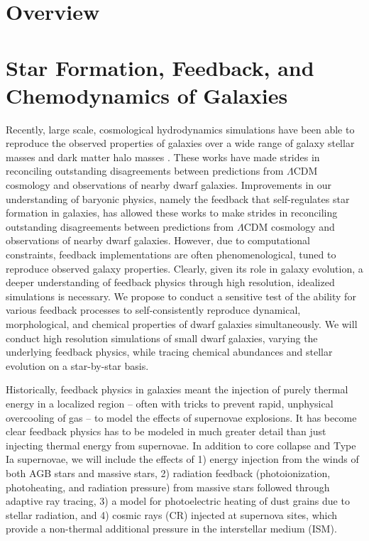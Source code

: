 \documentclass[11pt]{article}
\newcommand{\eg}{e.g.,}
\begin{document}
\maketitle

\section{Overview}

\section{Star Formation, Feedback, and Chemodynamics of Galaxies}

Recently, large scale, cosmological hydrodynamics simulations have been able to reproduce the observed properties of galaxies over a wide range of galaxy stellar masses and dark matter halo masses \citep[\eg][]{MUGS2010, MAGICC2013, Illustris1, Illustris2, OWLS, EAGLE, FIRE, APOSTLE, Latte}. These works have made strides in reconciling outstanding disagreements between predictions from $\Lambda$CDM cosmology and observations of nearby dwarf galaxies. Improvements in our understanding of baryonic physics, namely the feedback that self-regulates star formation in galaxies, has allowed these works to make strides in reconciling outstanding disagreements between predictions from $\Lambda$CDM cosmology and observations of nearby dwarf galaxies. However, due to computational constraints, feedback implementations are often phenomenological, tuned to reproduce observed galaxy properties. Clearly, given its role in galaxy evolution, a deeper understanding of feedback physics through high resolution, idealized simulations is necessary. We propose to conduct a sensitive test of the ability for various feedback processes to self-consistently reproduce dynamical, morphological, and chemical properties of dwarf galaxies simultaneously. We will conduct high resolution simulations of small dwarf galaxies, varying the underlying feedback physics, while tracing chemical abundances and stellar evolution on a star-by-star basis.

Historically, feedback physics in galaxies meant the injection of purely thermal energy in a localized region -- often with tricks to prevent rapid, unphysical overcooling of gas -- to model the effects of supernovae explosions. It has become clear feedback physics has to be modeled in much greater detail than just injecting thermal energy from supernovae. In addition to core collapse and Type Ia supernovae, we will include the effects of 1) energy injection from the winds of both AGB stars and massive stars, 2) radiation feedback (photoionization, photoheating, and radiation pressure) from massive stars followed through adaptive ray tracing, 3) a model for photoelectric heating of dust grains due to stellar radiation, and 4) cosmic rays (CR) injected at supernova sites, which provide a non-thermal additional pressure in the interstellar medium (ISM).
\end{document}
